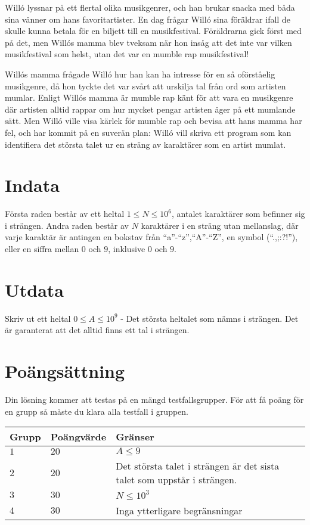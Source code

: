 \noindent
Willó lyssnar på ett flertal olika musikgenrer, och han brukar snacka med båda sina vänner om hans favoritartister. 
En dag frågar Willó sina föräldrar ifall de skulle kunna betala för en biljett till en musikfestival. 
Föräldrarna gick först med på det, men Willós mamma blev tveksam när hon insåg att det inte var vilken musikfestival som helst, utan det var en mumble rap musikfestival!

\noindent
Willós mamma frågade Willó hur han kan ha intresse för en så oförståelig musikgenre, då hon tyckte det var svårt att urskilja tal från ord som artisten mumlar. 
Enligt Willós mamma är mumble rap känt för att vara en musikgenre där artisten alltid rappar om hur mycket pengar artisten äger på ett mumlande sätt. 
Men Willó ville visa kärlek för mumble rap och bevisa att hans mamma har fel, och har kommit på en suverän plan: 
Willó vill skriva ett program som kan identifiera det största talet ur en sträng av karaktärer som en artist mumlat. 

\section*{Indata}
\noindent
Första raden består av ett heltal $1 \leqslant N \leqslant 10^6 $, antalet karaktärer som befinner sig i strängen.
Andra raden består av $N$ karaktärer i en sträng utan mellanslag, där varje karaktär är antingen en bokstav från ``a''-``z'',``A''-``Z'', en symbol (``.,;:?!''), eller en siffra mellan $0$ och $9$, inklusive $0$ och $9$.

\section*{Utdata}
\noindent
Skriv ut ett heltal $0 \leqslant A \leqslant 10^9$ - Det största heltalet som nämns i strängen. Det är garanterat att det alltid finns ett tal i strängen. 

\section*{Poängsättning}
Din lösning kommer att testas på en mängd testfallsgrupper.
\noindent
För att få poäng för en grupp så måste du klara alla testfall i gruppen.

\noindent
\begin{tabular}{| l | l | l |}
\hline
  Grupp & Poängvärde & Gränser \\ \hline
  $1$    & $20$       &  $A \leqslant 9$ \\ \hline
  $2$    & $20$       &  Det största talet i strängen är det sista talet som uppstår i strängen. \\ \hline
  $3$    & $30$       &  $N \leqslant 10^3$ \\ \hline
  $4$    & $30$       &  Inga ytterligare begränsningar \\ \hline
\end{tabular}
